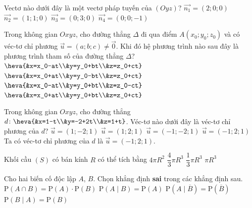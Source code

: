 \begin{ex}%
Vectơ nào dưới đây là một vectơ pháp tuyến của $(Oyz)$?
\choice
{\True $\vec{n_1}=(2;0;0)$}
{$\vec{n_2}=(1;1;0)$}
{$\vec{n_3}=(0;3;0)$}
{$\vec{n_4}=(0;0;-1)$}
\end{ex}

\begin{ex}%
Trong không gian $Oxyz$, cho đường thẳng $\Delta$ đi qua điểm $A(x_0;y_0;z_0)$ và có véc-tơ chỉ phương $\vec{u}=(a;b;c)\ne \vec{0}$. Khi đó hệ phương trình nào sau đây là phương trình tham số của đường thẳng $\Delta$?
\choice
{$\heva{&x=x_0-at\\&y=y_0+bt\\&z=z_0+ct}$}
{$\heva{&x=x_0+at\\&y=y_0-bt\\&z=z_0+ct}$}
{$\heva{&x=x_0-at\\&y=y_0+bt\\&z=z_0-ct}$}
{\True $\heva{&x=x_0+at\\&y=y_0+bt\\&z=z_0+ct}$}
\loigiai{

}
\end{ex}

\begin{ex}%
Trong không gian $Oxyz$, cho đường thẳng $d\colon \heva{&x=1-t\\&y=-2+2t\\&z=1+t}$. Véc-tơ nào dưới đây là véc-tơ chỉ phương của $d$?
\choice
{$\overrightarrow{u}=(1;-2;1)$}
{$\overrightarrow{u}=(1;2;1)$}
{$\overrightarrow{u}=(-1;-2;1)$}
{\True $\overrightarrow{u}=(-1;2;1)$}
\loigiai
{
Ta có véc-tơ chỉ phương của $d$ là $\overrightarrow{u}=(-1;2;1)$.
}
\end{ex}

\begin{ex}%
Khối cầu $(S)$ có bán kính $R$ có thể tích bằng
\choice
{$4\pi{R^2}$}
{\True $\dfrac{4}{3}\pi{R^3}$}
{$\dfrac{1}{3}\pi{R^3}$}
{$\pi{R^3}$}
\end{ex}

\begin{ex}%
Cho hai biến cố độc lập $A$, $B$. Chọn khẳng định \textbf{sai} trong các khẳng định sau.
\choice
{$\mathrm{P}(A\cap B)=\mathrm{P}(A)\cdot \mathrm{P}(B)$}
{$\mathrm{P}(A\mid B)=\mathrm{P}(A)$}
{\True $\mathrm{P}(A\mid \overline{B})=\mathrm{P}(\overline{B})$}
{ $\mathrm{P}(B\mid A)=\mathrm{P}(B)$}
\end{ex}

